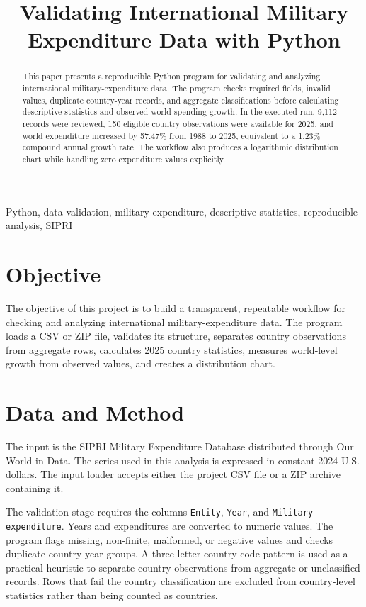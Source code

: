 \documentclass[conference]{IEEEtran}
\title{Validating International Military Expenditure Data with Python}
\author{
\IEEEauthorblockN{Angel Morenu}
\IEEEauthorblockA{
Data Science Project\\
Email: angelhdbaez@gmail.com}
}
\begin{document}
\maketitle

\begin{abstract}
This paper presents a reproducible Python program for validating and analyzing
international military-expenditure data. The program checks required fields,
invalid values, duplicate country-year records, and aggregate classifications
before calculating descriptive statistics and observed world-spending growth.
In the executed run, 9,112 records were reviewed, 150 eligible country
observations were available for 2025, and world expenditure increased by
57.47\% from 1988 to 2025, equivalent to a 1.23\% compound annual growth
rate. The workflow also produces a logarithmic distribution chart while
handling zero expenditure values explicitly.
\end{abstract}

\begin{IEEEkeywords}
Python, data validation, military expenditure, descriptive statistics,
reproducible analysis, SIPRI
\end{IEEEkeywords}

\section{Objective}
The objective of this project is to build a transparent, repeatable workflow
for checking and analyzing international military-expenditure data. The
program loads a CSV or ZIP file, validates its structure, separates country
observations from aggregate rows, calculates 2025 country statistics, measures
world-level growth from observed values, and creates a distribution chart.

\section{Data and Method}
The input is the SIPRI Military Expenditure Database distributed through Our
World in Data. The series used in this analysis is expressed in constant 2024
U.S. dollars. The input loader accepts either the project CSV file or a ZIP
archive containing it.

The validation stage requires the columns \texttt{Entity}, \texttt{Year}, and
\texttt{Military expenditure}. Years and expenditures are converted to
numeric values. The program flags missing, non-finite, malformed, or negative
values and checks duplicate country-year groups. A three-letter country-code
pattern is used as a practical heuristic to separate country observations
from aggregate or unclassified records. Rows that fail the country
classification are excluded from country-level statistics rather than being
counted as countries.
\end{document}
